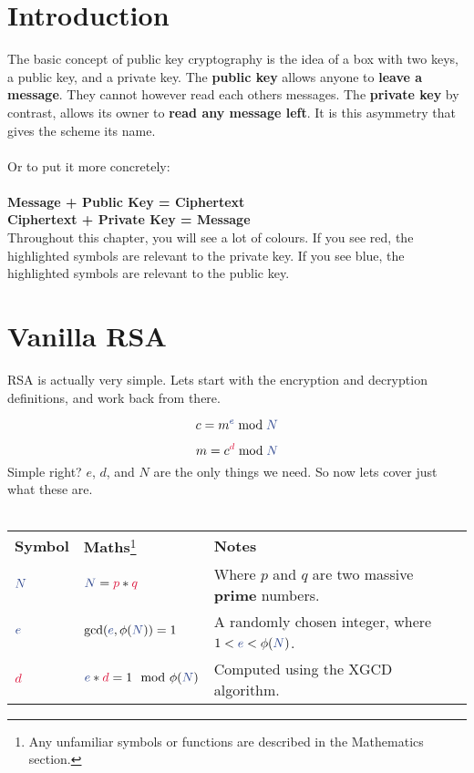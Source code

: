 
\section{Introduction}

	The basic concept of public key cryptography is the idea of a box with two keys, a public key, and a private key. The \textbf{public key} allows anyone to \textbf{leave a message}. They cannot however read each others messages. The \textbf{private key} by contrast, allows its owner to \textbf{read any message left}. It is this asymmetry that gives the scheme its name.\\
	\\
	Or to put	it more concretely:\\
	\\
	\textbf{Message + \textcolor{B}{Public Key} = Ciphertext}\\
	\textbf{Ciphertext + \textcolor{R}{Private Key} = Message}\\

	Throughout this chapter, you will see a lot of colours. If you see \textcolor{R}{red}, the highlighted symbols are relevant to the \textcolor{R}{private key}. If you see \textcolor{B}{blue}, the highlighted symbols are relevant to the \textcolor{B}{public key}.

\section{Vanilla RSA}

	RSA is actually very simple. Lets start with the encryption and decryption definitions, and work back from there.

	$$ c = m^{\textcolor{B}{e}} \bmod \textcolor{B}{N} $$

	$$ m = c^{\textcolor{R}{d}} \bmod \textcolor{B}{N} $$
	Simple right? $e$, $d$, and $N$ are the only things we need. So now lets cover just what these are.\\
	\\
  \begin{tabularx}{\linewidth}{l l X}
  \textbf{Symbol} & \textbf{Maths}\footnote{Any unfamiliar symbols or functions are described in the Mathematics section.} & \textbf{Notes}\\
  $\textcolor{B}{N}$ & $\textcolor{B}{N} = \textcolor{R}{p} * \textcolor{R}{q}$ & Where $p$ and $q$ are two massive \textbf{prime} numbers.
  \\
  $\textcolor{B}{e}$ & $\gcd(\textcolor{B}{e},\phi(\textcolor{B}{N}))=1$ & A randomly chosen integer, where $1 < \textcolor{B}{e} < \phi(\textcolor{B}{N})$.
  \\
  $\textcolor{R}{d}$ & $\textcolor{B}{e}*\textcolor{R}{d} = 1 \mod \phi(\textcolor{B}{N})$ & Computed using the XGCD algorithm.
  \\
  \end{tabularx}


